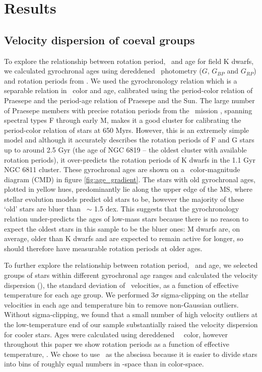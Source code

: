\section{Results}
\label{sec:results}

\subsection{Velocity dispersion of coeval groups}
\label{sec:age_cut}

To explore the relationship between rotation period, \teff\ and age for field
K dwarfs, we calculated gyrochronal ages using dereddened \citep[extinction
was calculated using the][Python package]{green2018} \Gaia\ photometry
($G$, $G_{BP}$ and $G_{RP}$) and rotation periods from \citet{mcquillan2014}.
We used the \citet{angus2019} gyrochronology relation which is a separable
relation in \gcolor\ color and age, calibrated using the period-color relation
of Praesepe and the period-age relation of Praesepe and the Sun.
The large number of Praesepe members with precise rotation periods from the
\ktwo\ mission \citep{howell2013, douglas2017, rebull2017}, spanning spectral
types F through early M, makes it a good cluster for calibrating the
period-color relation of stars at 650 Myrs.
However, this is an extremely simple model and although it accurately
describes the rotation periods of F and G stars up to around 2.5 Gyr (the age
of NGC 6819 -- the oldest cluster with available rotation periods), it
over-predicts the rotation periods of K dwarfs in the 1.1 Gyr NGC 6811
cluster.
These gyrochronal ages are shown on a \gaia\ color-magnitude diagram (CMD) in
figure \ref{fig:age_gradient}.
The stars with old gyrochronal ages, plotted in yellow hues, predominantly lie
along the upper edge of the MS, where stellar evolution models predict old
stars to be, however the majority of these `old' stars are bluer than \gcolor\
$\sim$ 1.5 dex.
This suggests that the \citet{angus2019} gyrochronology relation
under-predicts the ages of low-mass stars because there is no reason to expect
the oldest stars in this sample to be the bluer ones: M dwarfs are, on
average, older than K dwarfs and are expected to remain active for longer, so
should therefore have measurable rotation periods at older ages.

To further explore the relationship between rotation period, \teff\ and age,
we selected groups of stars within different gyrochronal age ranges and
calculated the velocity dispersion (\sigmavb), the standard deviation of \vb\
velocities, as a function of effective temperature for each age group.
We performed 3$\sigma$ sigma-clipping on the stellar velocities in each age
and temperature bin to remove non-Gaussian outliers.
Without sigma-clipping, we found that a small number of high velocity
outliers at the low-temperature end of our sample substantially raised the
velocity dispersion for cooler stars.
Ages were calculated using dereddened \gaia\ \gcolor\ color, however
throughout this paper we show rotation periods as a function of effective
temperature, \teff.
We chose to use \teff\ as the abscissa because it is easier to divide stars
into bins of roughly equal numbers in \teff-space than in color-space.


